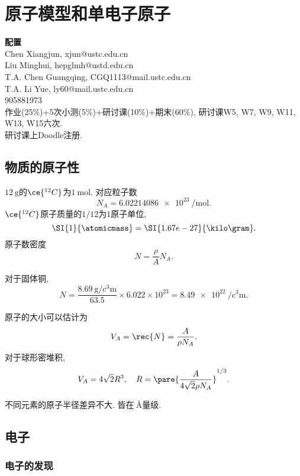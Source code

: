 \documentclass[hidelinks]{ctexart}
\begin{document}
\section{原子模型和单电子原子} %
\label{sec:原子模型和单电子原子}

\noindent\textbf{配置}\\[.5em]
\noindent
Chen Xiangjun, xjun@ustc.edu.cn \\
Liu Minghui, hepglmh@ustd.edu.cn \\
T.A. Chen Guangqing, CGQ1113@mail.ustc.edu.cn \\
T.A. Li Yue, ly60@mail.ustc.edu.cn \\
905881973\\
作业(25\%)+5次小测(5\%)+研讨课(10\%)+期末(60\%), 研讨课W5, W7, W9, W11, W13, W15六次.\\
研讨课上Doodle注册.

\subsection{物质的原子性} %
\label{sub:物质的原子性}

$\SI{12}{\gram}$的$\ce{^{12}C}$为$\SI{1}{\mole}$. 对应粒子数
\[ N_A = \SI{6.02214086e23}{\per\mol}. \]
$\ce{^{12}C}$原子质量的$1/12$为$1$原子单位,
\[ \SI{1}{\atomicmass} = \SI{1.67e-27}{\kilo\gram}. \]
原子数密度
\[ N = \frac{\rho}{A}N_A. \]
\begin{ex}
    对于固体铜,
    \[ N = \frac{\SI{8.69}{\gram\per\cubic\centi\meter}}{63.5}\times 6.022\times 10^{23} = \SI{8.49e22}{\per\cubic\centi\meter}. \]
\end{ex}
原子的大小可以估计为
\[ V_A = \rec{N} = \frac{A}{\rho N_A}. \]
对于球形密堆积,
\[ V_A = 4\sqrt{2}R^3,\quad R = \pare{\frac{A}{4\sqrt{2}\rho N_A}}^{1/3}. \]
\begin{remark}
    不同元素的原子半径差异不大. 皆在$\SI{}{\angstrom}$量级.
\end{remark}


\subsection{电子} %
\label{sub:电子}

\subsubsection{电子的发现} %
\label{ssub:电子的发现}
\end{document}
